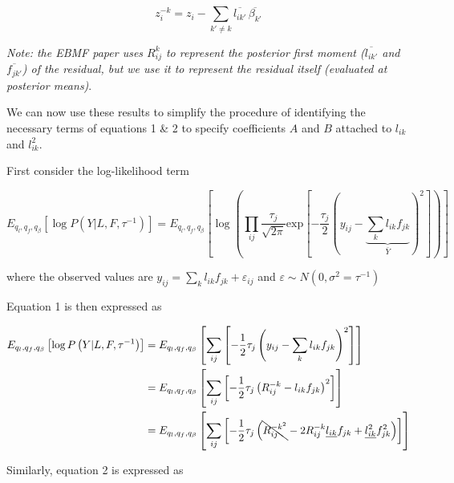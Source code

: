 \documentclass{article}[12pt]
\begin{document}
\begin{equation}\label{eq:zk}
    z_{i}^{-k} = z_i - \sum_{k'\neq k}\overline{l_{ik'}}\,\overline{\beta_{k'}}
\end{equation}

\textit{Note: the EBMF paper uses $R_{ij}^{k}$ to represent the posterior first moment ($\overline{l_{ik'}}$ and $\overline{f_{jk'}}$) of the residual, but we use it to represent the residual itself (evaluated at posterior means)}.

\medskip
We can now use these results to simplify the procedure of identifying the necessary terms of equations 1 \& 2 to specify coefficients $A$ and $B$ attached to $l_{ik}$ and $l_{ik}^{2}$.

First consider the log-likelihood term

\begin{equation}
    E_{q_l, q_f, q_{\beta}}\left[\log P\left(Y \vert L, F, \tau^{-1}\right)\right] = E_{q_l, q_f, q_{\beta}}\left[\log \left(\prod_{ij} \frac{\tau_{j}}{\sqrt{2\pi}}\text{exp}\left[-\frac{\tau_{j}}{2}\left(y_{ij}-\underbrace{\sum_{k}l_{ik}f_{jk}}_{\bar{Y}}\right)^2\right]\right)\right]
\end{equation}

where the observed values are $y_{ij} = \sum_{k}l_{ik}f_{jk} + \varepsilon_{ij}$ and $\varepsilon \sim N\left(0, \sigma^2 = \tau^{-1}\right)$

Equation 1 is then expressed as

\begin{align}
    E_{q_l, q_f, q_{\beta}}\left[\log P\left(Y \vert L, F, \tau^{-1}\right)\right] &= E_{q_l, q_f, q_{\beta}}\left[\sum_{ij}\left[-\frac{1}{2}\tau_{j}\left(y_{ij}-\sum_{k}l_{ik}f_{jk}\right)^2\right]\right]\\
    &= E_{q_l, q_f, q_{\beta}}\left[\sum_{ij}\left[-\frac{1}{2}\tau_{j}\left(R_{ij}^{-k} - l_{ik}f_{jk}\right)^2\right]\right]\\
    &= E_{q_l, q_f, q_{\beta}}\left[\sum_{ij}\left[-\frac{1}{2}\tau_{j}\left(\bcancel{R_{ij}^{-k^2}} - 2R_{ij}^{-k}
    \underline{l_{ik}}f_{jk}+\underline{l_{ik}^{2}}f_{jk}^{2}\right)\right]\right]
\end{align}

Similarly, equation 2 is expressed as
\end{document}
